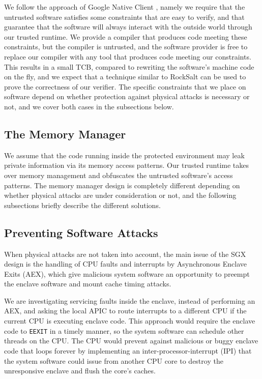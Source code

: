 We follow the approach of Google Native Client \cite{yee2009native}
\cite{sehr2010adapting}, namely we require that the untrusted software
satisfies some constraints that are easy to verify, and that guarantee that the
software will always interact with the outside world through our trusted
runtime. We provide a compiler that produces code meeting these constraints,
but the compiler is untrusted, and the software provider is free to replace our
compiler with any tool that produces code meeting our constraints. This results
in a small TCB, compared to rewriting the software's machine code on the fly,
and we expect that a technique similar to RockSalt \cite{morrisett2012rocksalt}
can be used to prove the correctness of our verifier. The specific constraints
that we place on software depend on whether protection against physical attacks
is necessary or not, and we cover both cases in the subsections below.


\subsection{The Memory Manager}
\label{sec:memory_manager}

We assume that the code running inside the protected environment may leak
private information via its memory access patterns. Our trusted runtime takes
over memory management and obfuscates the untrusted software's access patterns.
The memory manager design is completely different depending on whether physical
attacks are under consideration or not, and the following subsections briefly
describe the different solutions.


\subsection{Preventing Software Attacks}

When physical attacks are not taken into account, the main issue of the SGX
design is the handling of CPU faults and interrupts by Asynchronous Enclave
Exits (AEX), which give malicious system software an opportunity to preempt the
enclave software and mount cache timing attacks.

We are investigating servicing faults inside the enclave, instead of performing
an AEX, and asking the local APIC to route interrupts to a different CPU if the
current CPU is executing enclave code. This approach would require the enclave
code to \texttt{EEXIT} in a timely manner, so the system software can schedule
other threads on the CPU. The CPU would prevent against malicious or buggy
enclave code that loops forever by implementing an inter-processor-interrupt
(IPI) that the system software could issue from another CPU core to destroy the
unresponsive enclave and flush the core's caches.

